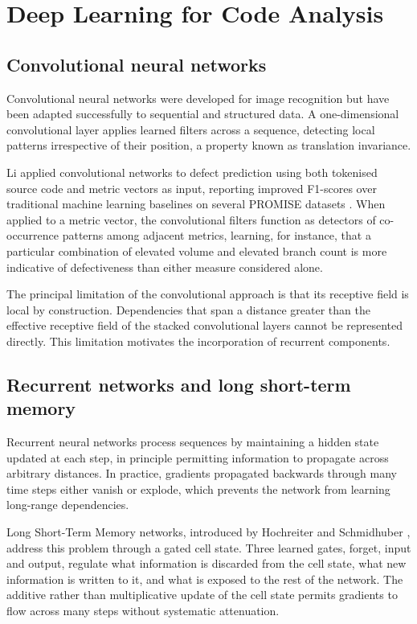\documentclass[12pt,a4paper,oneside]{report}
\begin{document}
\section{Deep Learning for Code Analysis}

\subsection{Convolutional neural networks}

Convolutional neural networks were developed for image recognition but have been adapted successfully to sequential and structured data. A one-dimensional convolutional layer applies learned filters across a sequence, detecting local patterns irrespective of their position, a property known as translation invariance.

Li applied convolutional networks to defect prediction using both tokenised source code and metric vectors as input, reporting improved F1-scores over traditional machine learning baselines on several PROMISE datasets \cite{li2017}. When applied to a metric vector, the convolutional filters function as detectors of co-occurrence patterns among adjacent metrics, learning, for instance, that a particular combination of elevated volume and elevated branch count is more indicative of defectiveness than either measure considered alone.

The principal limitation of the convolutional approach is that its receptive field is local by construction. Dependencies that span a distance greater than the effective receptive field of the stacked convolutional layers cannot be represented directly. This limitation motivates the incorporation of recurrent components.

\subsection{Recurrent networks and long short-term memory}

Recurrent neural networks process sequences by maintaining a hidden state updated at each step, in principle permitting information to propagate across arbitrary distances. In practice, gradients propagated backwards through many time steps either vanish or explode, which prevents the network from learning long-range dependencies.

Long Short-Term Memory networks, introduced by Hochreiter and Schmidhuber \cite{hochreiter1997}, address this problem through a gated cell state. Three learned gates, forget, input and output, regulate what information is discarded from the cell state, what new information is written to it, and what is exposed to the rest of the network. The additive rather than multiplicative update of the cell state permits gradients to flow across many steps without systematic attenuation.
\end{document}
